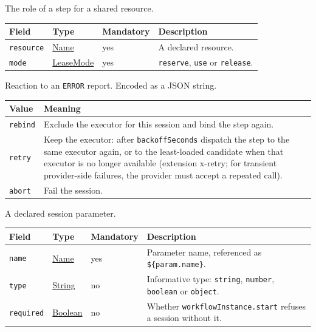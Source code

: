 \documentclass[a4paper]{arrowhead}
\newcommand{\mref}[1]{{\textcolor{ArrowheadPurple}{\hyperref[sec:model:#1]{#1}}}}
\newcommand{\pref}[1]{{\textcolor{ArrowheadGrey}{\hyperref[sec:model:primitives:#1]{#1}}}}
\begin{document}
The role of a step for a shared resource.

{\small
\begin{longtable}{|p{3.7cm}|p{4.2cm}|p{1.6cm}|p{6.3cm}|}

\hline
\rowcolor{gray!33} Field & Type & Mandatory & Description \\ \hline
\endhead
\texttt{resource} & \pref{Name} & yes & A declared resource. \\ \hline
\texttt{mode} & \mref{LeaseMode} & yes & \texttt{reserve}, \texttt{use} or \texttt{release}. \\ \hline
\end{longtable}
}

Reaction to an \texttt{ERROR} report.
 Encoded as a JSON string.
{\small
\begin{longtable}{|p{3.9cm}|p{11.9cm}|}

\hline
\rowcolor{gray!33} Value & Meaning \\ \hline
\endhead
\texttt{rebind} & Exclude the executor for this session and bind the step again. \\ \hline
\texttt{retry} & Keep the executor: after \texttt{backoff\allowbreak{}Seconds} dispatch the step to the same executor again, or to the least-loaded candidate when that executor is no longer available (extension x-retry; for transient provider-side failures, the provider must accept a repeated call). \\ \hline
\texttt{abort} & Fail the session. \\ \hline
\end{longtable}
}

A declared session parameter.

{\small
\begin{longtable}{|p{3.7cm}|p{4.2cm}|p{1.6cm}|p{6.3cm}|}

\hline
\rowcolor{gray!33} Field & Type & Mandatory & Description \\ \hline
\endhead
\texttt{name} & \pref{Name} & yes & Parameter name, referenced as \texttt{\$\{param.name\}}. \\ \hline
\texttt{type} & \pref{String} & no & Informative type: \texttt{string}, \texttt{number}, \texttt{boolean} or \texttt{object}. \\ \hline
\texttt{required} & \pref{Boolean} & no & Whether \texttt{workflow\allowbreak{}Instance.\allowbreak{}start} refuses a session without it. \\ \hline
\end{longtable}
}
\end{document}
